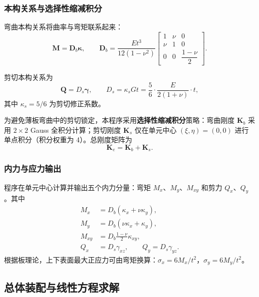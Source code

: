 \documentclass[UTF8,a4paper,zihao=-4]{ctexart}
\newcommand{\Dmat}{\bm{D}}
\newcommand{\Kmat}{\bm{K}}
\begin{document}
\subsubsection{本构关系与选择性缩减积分}

弯曲本构关系将曲率与弯矩联系起来：
\begin{equation}
    \bm{M} = \Dmat_b \bm{\kappa},\qquad
    \Dmat_b =
    \frac{Et^3}{12(1-\nu^2)}
    \begin{bmatrix}
        1 & \nu & 0\\
        \nu & 1 & 0\\
        0 & 0 & \dfrac{1-\nu}{2}
    \end{bmatrix}.
\end{equation}

剪切本构关系为
\begin{equation}
    \bm{Q} = D_s \bm{\gamma},\qquad
    D_s = \kappa_s G t = \frac{5}{6}\cdot\frac{E}{2(1+\nu)}\cdot t,
\end{equation}
其中 $\kappa_s=5/6$ 为剪切修正系数。

为避免薄板弯曲中的剪切锁定，本程序采用\textbf{选择性缩减积分}策略：弯曲刚度 $\Kmat_b$ 采用 $2\times2$ Gauss 全积分计算；剪切刚度 $\Kmat_s$ 仅在单元中心 $(\xi,\eta)=(0,0)$ 进行单点积分（积分权重为 4）。总刚度矩阵为
\begin{equation}
    \Kmat_e = \Kmat_b + \Kmat_s.
\end{equation}

\subsubsection{内力与应力输出}

程序在单元中心计算并输出五个内力分量：弯矩 $M_x$、$M_y$、$M_{xy}$ 和剪力 $Q_x$、$Q_y$。其中
\begin{align}
    M_x &= D_b(\kappa_x + \nu\kappa_y),\\
    M_y &= D_b(\nu\kappa_x + \kappa_y),\\
    M_{xy} &= D_b\frac{1-\nu}{2}\kappa_{xy},\\
    Q_x &= D_s \gamma_{xz},\qquad
    Q_y = D_s \gamma_{yz}.
\end{align}
根据板理论，上下表面最大正应力可由弯矩换算：$\sigma_x = 6M_x/t^2$，$\sigma_y = 6M_y/t^2$。

\subsection{总体装配与线性方程求解}
\end{document}
